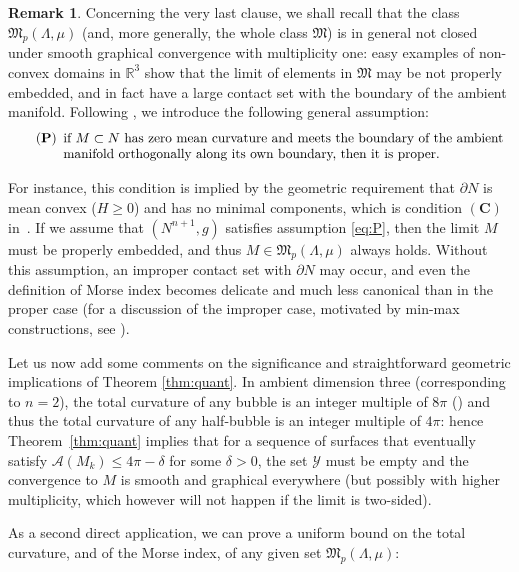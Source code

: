 \documentclass[JEP,XML,SOM,Unicode]{cedram}
\let\mathcal\mathscr
\newcounter{cas}
\theoremstyle{definition}
\newtheorem{rmk}[thm]{Remark}
\newcommand{\R}{\mathbb{R}}
\begin{document}
\begin{rmk}\label{rem:properness}
Concerning the very last clause, we shall recall that the class $\mathfrak{M}_p(\Lambda,\mu)$ (and, more generally, the whole class $\mathfrak{M}$) is in general not closed under smooth graphical convergence with multiplicity one: easy examples of non-convex domains in $\R^3$ show that the limit of elements in $\mathfrak{M}$ may be not properly embedded, and in fact have a large contact set with the boundary of the ambient manifold. Following \cite{ACS17}, we introduce the following general assumption:
\begin{equation}
\tag{\textbf{P}}\label{eq:P}
\begin{array}[t]{l}
\text{if $M\subset N$ has zero mean curvature and meets the boundary of the ambient}\\
\text{manifold orthogonally along its own boundary, then it is proper.}
\end{array}
\end{equation}

For instance, this condition is implied by the geometric requirement that $\partial N$ is mean convex (\ie $H\geq 0$) and has no minimal components, which is condition $(\textbf{C})$ in~\cite{ACS17}.
If we assume that $(N^{n+1},g)$ satisfies assumption \eqref{eq:P}, then the limit $M$ must be properly embedded, and thus $M\in\mathfrak{M}_{p}(\Lambda,\mu)$ always holds. Without this assumption, an improper contact set with $\partial N$ may occur, and even the definition of Morse index becomes delicate and much less canonical than in the proper case (for a discussion of the improper case, motivated by min-max constructions, see \cite{GZ18}).
\end{rmk}

Let us now add some comments on the significance and straightforward geometric implications of Theorem \ref{thm:quant}.
In ambient dimension three (corresponding to $n=2$), the total curvature of any bubble is an integer multiple of $8\pi$ (\cf \cite{Oss63, Oss64}) and thus the total curvature of any half-bubble is an integer multiple of $4\pi$: hence Theorem~\ref{thm:quant} implies that for a sequence of surfaces that eventually satisfy $\mathcal{A}(M_k)\leq 4\pi-\delta$ for some $\delta>0$, the set $\mathcal{Y}$ must be empty and the convergence to $M$ is smooth and graphical everywhere (but possibly with higher multiplicity, which however will not happen if the limit is two-sided). 

As a second direct application, we can prove a uniform bound on the total curvature, and of the Morse index, of any given set $\mathfrak{M}_p(\Lambda,\mu)$:
\end{document}
